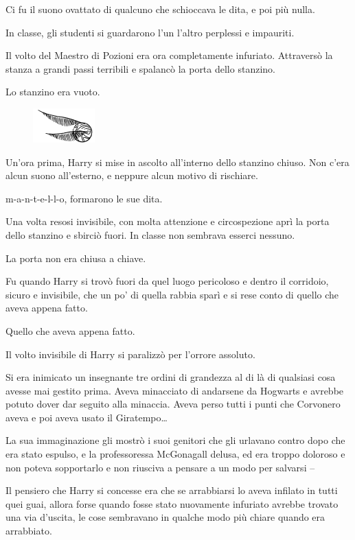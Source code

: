Ci fu il suono ovattato di qualcuno che schioccava le dita, e poi più nulla.

In classe, gli studenti si guardarono l’un l’altro perplessi e impauriti.

Il volto del Maestro di Pozioni era ora completamente infuriato. Attraversò la stanza a grandi passi terribili e spalancò la porta dello stanzino.

Lo stanzino era vuoto.

\begin{figure}[h!]
        \includegraphics[scale=0.4]{boccino.png}
        \centering
\end{figure}

Un’ora prima, Harry si mise in ascolto all’interno dello stanzino chiuso. Non c’era alcun suono all’esterno, e neppure alcun motivo di rischiare.

m-a-n-t-e-l-l-o, formarono le sue dita.

Una volta resosi invisibile, con molta attenzione e circospezione aprì la porta dello stanzino e sbirciò fuori. In classe non sembrava esserci nessuno.

La porta non era chiusa a chiave.

Fu quando Harry si trovò fuori da quel luogo pericoloso e dentro il corridoio, sicuro e invisibile, che un po’ di quella rabbia sparì e si rese conto di quello che aveva appena fatto.

Quello che aveva appena fatto.

Il volto invisibile di Harry si paralizzò per l’orrore assoluto.

Si era inimicato un insegnante tre ordini di grandezza al di là di qualsiasi cosa avesse mai gestito prima. Aveva minacciato di andarsene da Hogwarts e avrebbe potuto dover dar seguito alla minaccia. Aveva perso tutti i punti che Corvonero aveva e poi aveva usato il Giratempo…

La sua immaginazione gli mostrò i suoi genitori che gli urlavano contro dopo che era stato espulso, e la professoressa McGonagall delusa, ed era troppo doloroso e non poteva sopportarlo e non riusciva a pensare a un modo per salvarsi –

Il pensiero che Harry si concesse era che se arrabbiarsi lo aveva infilato in tutti quei guai, allora forse quando fosse stato nuovamente infuriato avrebbe trovato una via d’uscita, le cose sembravano in qualche modo più chiare quando era arrabbiato.

